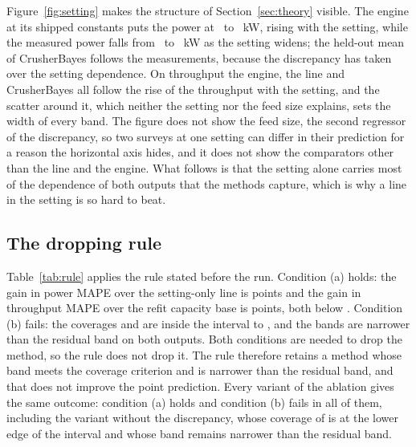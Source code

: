 \documentclass[journal]{IEEEtran}
\begin{document}
Figure~\ref{fig:setting} makes the structure of Section~\ref{sec:theory} visible. The engine at its shipped constants
puts the power at \calKwMin\ to \calKwMax~kW, rising with the setting, while the measured power falls from \kwMMax\ to
\kwMMin~kW as the setting widens; the held-out mean of CrusherBayes follows the measurements, because the discrepancy has taken over the setting
dependence. On throughput the engine, the line and CrusherBayes all follow the rise of the throughput with the setting,
and the scatter around it, which neither the setting nor the feed size explains, sets the width of every band. The figure
does not show the feed size, the second regressor of the discrepancy, so two surveys at one setting can differ in their
prediction for a reason the horizontal axis hides, and it does not show the comparators other than the line and the
engine. What follows is that the setting alone carries most of the dependence of both outputs that the methods capture,
which is why a line in the setting is so hard to beat.

\subsection{The dropping rule}

Table~\ref{tab:rule} applies the rule stated before the run. Condition (a) holds: the gain in power MAPE over the setting-only
line is \gainBlinKw{} points and the gain in throughput MAPE over the refit capacity base is \gainBackTph{} points, both below
\marginPts. Condition (b) fails: the coverages \cbTphCov{} and \cbKwCov{} are inside the interval \covLo{} to \covHi, and the
bands are narrower than the residual band on both outputs. Both conditions are needed to drop the method, so the rule does
not drop it. The rule therefore retains a method whose band meets the coverage criterion and is narrower than the residual
band, and that does not improve the point prediction. Every variant
of the ablation gives the same outcome: condition (a) holds and condition (b) fails in all of them, including the variant
without the discrepancy, whose coverage of \abNoDiscKwCov{} is at the lower edge of the interval and whose band remains
narrower than the residual band.

\begin{table}[!t]
\caption{The terms of the rule for dropping the method as a predictor, evaluated on the held-out scores of the ten surveys; the reference is the setting-only line for power and the refit capacity base for throughput, and the gain is computed from the unrounded errors, as in Table~\ref{tab:paired}.}
\label{tab:rule}
\centering\footnotesize

\end{table}
\end{document}

